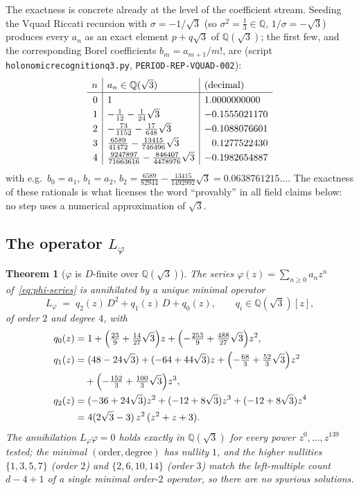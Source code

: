 \documentclass[11pt,reqno]{amsart}
\renewcommand{\_}{\vquadorigunderscore\allowbreak}
\theoremstyle{plain}
\newtheorem{theorem}{Theorem}[section]
\theoremstyle{definition}
\newcommand{\Lphi}{L_{\varphi}}
\newcommand{\Qsqrt}{\mathbb{Q}(\sqrt3)}
\begin{document}
The exactness is concrete already at the level of the coefficient stream. Seeding the V\_quad
Riccati recursion with $\sigma=-1/\sqrt3$ (so $\sigma^2=\tfrac13\in\mathbb{Q}$,
$1/\sigma=-\sqrt3$) produces every $a_n$ as an exact element $p+q\sqrt3$ of $\Qsqrt$; the first
few, and the corresponding Borel coefficients $b_m=a_{m+1}/m!$, are
(script \texttt{holonomic\_recognition\_q3.py}, \texttt{PERIOD-REP-VQUAD-002}):
\begin{equation}\label{eq:coeffstream}
\renewcommand{\arraystretch}{1.25}
\begin{array}{r|l|l}
 n & a_n\in\Qsqrt & \text{(decimal)}\\\hline
 0 & 1 & 1.0000000000\\
 1 & -\tfrac{1}{12}-\tfrac{1}{24}\sqrt3 & -0.1555021170\\
 2 & -\tfrac{73}{1152}-\tfrac{17}{648}\sqrt3 & -0.1088076601\\
 3 & \tfrac{6589}{41472}-\tfrac{13415}{746496}\sqrt3 & \phantom{-}0.1277522430\\
 4 & \tfrac{9247897}{71663616}-\tfrac{846407}{4478976}\sqrt3 & -0.1982654887
\end{array}
\end{equation}
with e.g.\ $b_0=a_1$, $b_1=a_2$, $b_2=\tfrac{6589}{82944}-\tfrac{13415}{1492992}\sqrt3=
0.0638761215\ldots$. The exactness of these rationals is what licenses the word ``provably'' in
all field claims below: no step uses a numerical approximation of $\sqrt3$.

\subsection{The operator \texorpdfstring{$\Lphi$}{Lphi}}
\begin{theorem}[$\varphi$ is $D$-finite over $\Qsqrt$]\label{thm:Lphi}
The series $\varphi(z)=\sum_{n\ge0}a_nz^n$ of~\eqref{eq:phi-series} is annihilated by a unique
minimal operator
\[
  \Lphi \;=\; q_2(z)\,D^2 + q_1(z)\,D + q_0(z),\qquad q_i\in\Qsqrt[z],
\]
of order $2$ and degree $4$, with
\begin{align*}
  q_0(z)&=1+\Bigl(\tfrac{23}{9}+\tfrac{14}{27}\sqrt3\Bigr)z
              +\Bigl(-\tfrac{253}{9}+\tfrac{488}{27}\sqrt3\Bigr)z^2,\\
  q_1(z)&=(48-24\sqrt3)+(-64+44\sqrt3)z+\Bigl(-\tfrac{68}{3}+\tfrac{52}{3}\sqrt3\Bigr)z^2\\
        &\quad+\Bigl(-\tfrac{152}{3}+\tfrac{100}{3}\sqrt3\Bigr)z^3,\\
  q_2(z)&=(-36+24\sqrt3)z^2+(-12+8\sqrt3)z^3+(-12+8\sqrt3)z^4\\
        &=4(2\sqrt3-3)\,z^2\,(z^2+z+3).
\end{align*}
The annihilation $\Lphi\varphi=0$ holds exactly in $\Qsqrt$ for every power $z^0,\dots,z^{139}$
tested; the minimal $(\text{order},\text{degree})$ has nullity $1$, and the higher nullities
$\{1,3,5,7\}$ (order $2$) and $\{2,6,10,14\}$ (order $3$) match the left-multiple count
$d-4+1$ of a single minimal order-$2$ operator, so there are no spurious solutions.
\end{theorem}
\end{document}
